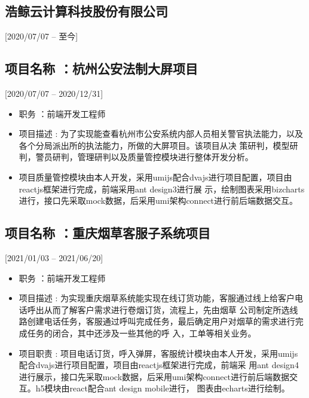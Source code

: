 \documentclass{mycv}
\begin{document}
\subsection{浩鲸云计算科技股份有限公司}[2020/07/07 – 至今]


\subsection{项目名称 ：杭州公安法制大屏项目}[2020/07/07 – 2020/12/31]

\begin{itemize}
  \item 职务 ：前端开发工程师
  \item 项目描述 : 为了实现能查看杭州市公安系统内部人员相关警官执法能力，以及各个分局派出所的执法能力，所做的大屏项目。该项目从决
        策研判，模型研判，警员研判，管理研判以及质量管控模块进行整体开发分析。
  \item 项目质量管控模块由本人开发，采用umijs配合dvajs进行项目配置，项目由reactjs框架进行完成，前端采用ant design3进行展
        示，绘制图表采用bizcharts进行，接口先采取mock数据，后采用umi架构connect进行前后端数据交互。
\end{itemize}

\subsection{项目名称 ：重庆烟草客服子系统项目}[2021/01/03 – 2021/06/20]

\begin{itemize}
  \item 职务 ：前端开发工程师
  \item 项目描述 : 为实现重庆烟草系统能实现在线订货功能，客服通过线上给客户电话呼出从而了解客户需求进行卷烟订货，流程上，先由烟草
        公司制定所选线路创建电话任务，客服通过呼叫完成任务，最后确定用户对烟草的需求进行完成任务的闭合，其中还涉及一些其他的呼
        入，工单等相关业务。
  \item 项目职责 : 项目电话订货，呼入弹屏，客服统计模块由本人开发，采用umijs配合dvajs进行项目配置，项目由reactjs框架进行完成，前端采
        用ant design4进行展示，接口先采取mock数据，后采用umi架构connect进行前后端数据交互。h5模块由react配合ant design mobile进行，
        图表由echarts进行绘制。
\end{itemize}
\end{document}
